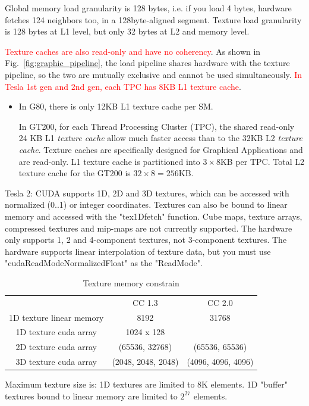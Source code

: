 Global memory load granularity is 128 bytes, i.e. if you load 4 bytes,
hardware fetches 124 neighbors too, in a 128byte-aligned
segment. Texture load granularity is 128 bytes at L1 level, but only
32 bytes at L2 and memory level.

\textcolor{red}{Texture caches are also read-only and have no
  coherency}.
As shown in Fig.~\ref{fig:graphic_pipeline}, the load pipeline shares
hardware with the texture pipeline, so the two are mutually exclusive
and cannot be used simultaneously.
\textcolor{red}{In Tesla 1st gen and 2nd gen, each TPC has 8KB L1
  texture cache}.
\begin{itemize}
\item In G80, there is only 12KB L1 texture cache per SM.

  In GT200, for each Thread Processing Cluster
  (TPC), the shared read-only 24 KB L1 {\it texture cache} allow much
  faster access than to the 32KB L2 {\it texture cache}. Texture caches
  are specifically designed for Graphical Applications and are
  read-only. L1 texture cache is partitioned into $3\times 8$KB per
  TPC. Total L2 texture cache for the GT200 is $32\times 8=256$KB.
\end{itemize}

Tesla 2: CUDA supports 1D, 2D and 3D textures, which can be accessed
with normalized (0..1) or integer coordinates. Textures can also be
bound to linear memory and accessed with the "tex1Dfetch" function.
Cube maps, texture arrays, compressed textures and mip-maps are not
currently supported.  The hardware only supports 1, 2 and 4-component
textures, not 3-component textures.  The hardware supports linear
interpolation of texture data, but you must use
"cudaReadModeNormalizedFloat" as the "ReadMode".

\begin{table}
  \centering
  \begin{tabular}[hbt]{ccc}
    & CC 1.3 & CC 2.0 \\
    1D texture linear memory & 8192 & 31768 \\
    1D texture cuda array & 1024 x 128 \\
    2D texture cuda array & (65536, 32768) & (65536, 65536) \\
    3D texture cuda array & (2048, 2048, 2048) & (4096, 4096, 4096) \\
  \end{tabular}
  \caption{Texture memory constrain}
  \label{tab:texture_memory}
\end{table}
Maximum texture size is: 1D textures are limited to 8K elements. 1D
"buffer" textures bound to linear memory are limited to $2^{27}$
elements.

